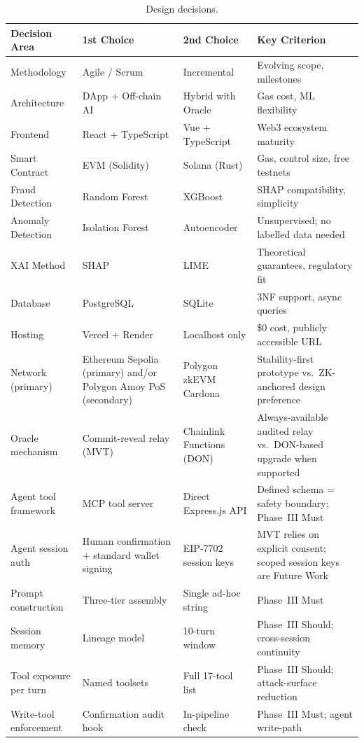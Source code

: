 \begin{table}[H]
\centering
\caption[Design decisions]{Design decisions.}
\label{tab:design-decisions}
\begin{tabular}{p{3cm}p{3cm}p{3cm}p{4.5cm}}
\toprule
\tableheadcolor
\textbf{Decision Area} & \textbf{1st Choice} & \textbf{2nd Choice} & \textbf{Key Criterion} \\
\midrule
Methodology & Agile / Scrum & Incremental & Evolving scope, milestones \\
Architecture & DApp + Off-chain AI & Hybrid with Oracle & Gas cost, ML flexibility \\
Frontend & React + TypeScript & Vue + TypeScript & Web3 ecosystem maturity \\
Smart Contract & EVM (Solidity) & Solana (Rust) & Gas, control size, free testnets \\
Fraud Detection & Random Forest & XGBoost & SHAP compatibility, simplicity \\
Anomaly Detection & Isolation Forest & Autoencoder & Unsupervised; no labelled data needed \\
XAI Method & SHAP & LIME & Theoretical guarantees, regulatory fit \\
Database & PostgreSQL & SQLite & 3NF support, async queries \\
Hosting & Vercel + Render & Localhost only & \$0 cost, publicly accessible URL \\
Network (primary) & Ethereum Sepolia (primary) and/or Polygon Amoy PoS (secondary) & Polygon zkEVM Cardona & Stability-first prototype vs.\ ZK-anchored design preference \\
Oracle mechanism & Commit-reveal relay (MVT) & Chainlink Functions (DON) & Always-available audited relay vs.\ DON-based upgrade when supported \\
Agent tool framework & MCP tool server & Direct Express.js API & Defined schema = safety boundary; Phase~III Must \\
Agent session auth & Human confirmation + standard wallet signing & EIP-7702 session keys & MVT relies on explicit consent; scoped session keys are Future Work \\
Prompt construction & Three-tier assembly & Single ad-hoc string & Phase~III Must \\
Session memory & Lineage model & 10-turn window & Phase~III Should; cross-session continuity \\
Tool exposure per turn & Named toolsets & Full 17-tool list & Phase~III Should; attack-surface reduction \\
Write-tool enforcement & Confirmation audit hook & In-pipeline check & Phase~III Must; agent write-path \\
\bottomrule
\end{tabular}
\end{table}


